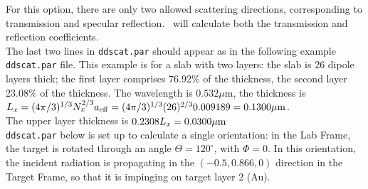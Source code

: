 	For this option, there are only two allowed scattering directions,
	corresponding to transmission and specular reflection.
	\ddscat\ will calculate both the transmission and reflection
	coefficients.\\
	The last two lines in {\tt ddscat.par} should appear as in the
	following example {\tt ddscat.par} file.  This example is
	for a slab with two layers: the slab is 26 dipole layers thick;
	the first layer comprises 76.92\%
	of the thickness, the second layer 23.08\% of the thickness.
	The wavelength is $0.532\mu$m, the thickness is
	$L_x=(4\pi/3)^{1/3}N_x^{2/3}{a}_{\rm eff}=(4\pi/3)^{1/3}(26)^{2/3}0.009189=
	0.1300{\mu{\rm m}}$.\\
	The upper layer thickness is $0.2308L_x=0.0300{\mu{\rm m}}$\\
	{\tt ddscat.par} below is set up to calculate a single orientation:
	in the Lab Frame, 
	the target is rotated through an angle $\Theta=120^\circ$, with
	$\Phi=0$.  In this orientation, the incident radiation is propagating
	in the $(-0.5,0.866,0)$ direction in the Target Frame, so that it
	is impinging on target layer 2 (Au).
	\\
